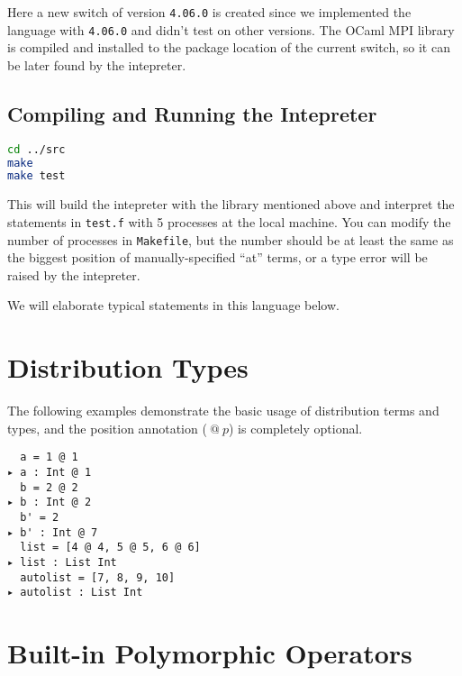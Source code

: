 \documentclass{report}
\makeatletter
\newcommand{\at}{~\texttt{@}~}
\makeatother
\begin{document}
Here a new switch of version \verb|4.06.0| is created since we implemented the language with \verb|4.06.0| and didn't test on other versions. The OCaml MPI library is compiled and installed to the package location of the current switch, so it can be later found by the intepreter.

\subsection{Compiling and Running the Intepreter}

\begin{lstlisting}[language=bash,caption={Compiling and Running the Intepreter}]
cd ../src
make
make test
\end{lstlisting}

This will build the intepreter with the library mentioned above and interpret the statements in \verb|test.f| with 5 processes at the local machine. You can modify the number of processes in \verb|Makefile|, but the number should be at least the same as the biggest position of manually-specified ``at'' terms, or a type error will be raised by the intepreter.

We will elaborate typical statements in this language below.

\section{Distribution Types}

The following examples demonstrate the basic usage of distribution terms and types, and the position annotation ($\at p$) is completely optional.

\vspace{1em}
\noindent
\verb|  a = 1 @ 1|
\\
\verb|▸ a : Int @ 1|
\\
\verb|  b = 2 @ 2|
\\
\verb|▸ b : Int @ 2|
\\
\verb|  b' = 2|
\\
\verb|▸ b' : Int @ 7|
\\
\verb|  list = [4 @ 4, 5 @ 5, 6 @ 6]|
\\
\verb|▸ list : List Int|
\\
\verb|  autolist = [7, 8, 9, 10]|
\\
\verb|▸ autolist : List Int|

\section{Built-in Polymorphic Operators}
\end{document}
